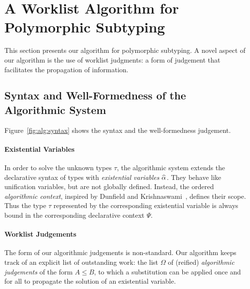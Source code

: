 \section{A Worklist Algorithm for Polymorphic Subtyping}\label{algorithmic_subtyping}

This section presents our algorithm for polymorphic
subtyping. A novel aspect of our algorithm is the use of worklist
judgments: a form of judgement that facilitates the propagation 
of information. 


\subsection{Syntax and Well-Formedness of the Algorithmic System}
Figure~\ref{fig:alg:syntax} shows the
syntax and the well-formedness judgement.  

\paragraph{Existential Variables}
In order to solve the unknown types $\tau$, the algorithmic system extends the
declarative syntax of types with \emph{existential variables} $\al$.  They
behave like unification variables, but are not globally defined. Instead, the
ordered \emph{algorithmic context}, inspired by Dunfield and
Krishnaswami~\cite{dunfield2013complete}, defines their scope. Thus 
the type $\tau$ represented by the corresponding existential variable is
always bound in the corresponding declarative context $\Psi$.

\paragraph{Worklist Judgements} The form of our algorithmic judgements is
non-standard. 
Our algorithm keeps track of an explicit list of
outstanding work: the list $\Omega$ of (reified) \emph{algorithmic judgements} 
of the form $A \leq B$,
to which a substitution can be applied once and for all to propagate the solution
of an existential variable. 

